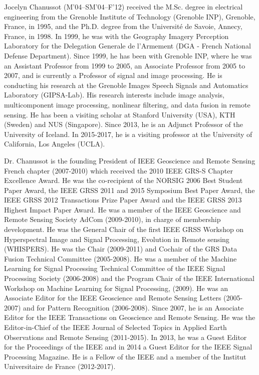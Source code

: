 \documentclass[10pt,twocolumn,twoside]{IEEEtran}
\begin{document}
\begin{IEEEbiography}{Jocelyn Chanussot} 
	(M’04–SM’04–F’12) received the M.Sc. degree in electrical engineering from the Grenoble Institute of Technology (Grenoble INP), Grenoble, France, in 1995, and the Ph.D. degree from the Université de Savoie, Annecy, France, in 1998. In 1999, he was with the Geography Imagery Perception Laboratory for the Delegation Generale de l'Armement (DGA - French National Defense Department). Since 1999, he has been with Grenoble INP, where he was an Assistant Professor from 1999 to 2005, an Associate Professor from 2005 to 2007, and is currently a Professor of signal and image processing. He is conducting his research at the Grenoble Images Speech Signals and Automatics Laboratory (GIPSA-Lab). His research interests include image analysis, multicomponent image processing, nonlinear filtering, and data fusion in remote sensing. He has been a visiting scholar at Stanford University (USA), KTH (Sweden) and NUS (Singapore). Since 2013, he is an Adjunct Professor of the University of Iceland. In 2015-2017, he is a visiting professor at the University of California, Los Angeles (UCLA).  
	
	Dr. Chanussot is the founding President of IEEE Geoscience and Remote Sensing French chapter (2007-2010) which received the 2010 IEEE GRS-S Chapter Excellence Award. He was the co-recipient of the NORSIG 2006 Best Student Paper Award, the IEEE GRSS 2011 and 2015 Symposium Best Paper Award, the IEEE GRSS 2012 Transactions Prize Paper Award and the IEEE GRSS 2013 Highest Impact Paper Award. He was a member of the IEEE Geoscience and Remote Sensing Society AdCom (2009-2010), in charge of membership development. He was the General Chair of the first IEEE GRSS Workshop on Hyperspectral Image and Signal Processing, Evolution in Remote sensing (WHISPERS). He was the Chair (2009-2011) and  Cochair of the GRS Data Fusion Technical Committee (2005-2008). He was a member of the Machine Learning for Signal Processing Technical Committee of the IEEE Signal Processing Society (2006-2008) and the Program Chair of the IEEE International Workshop on Machine Learning for Signal Processing, (2009). He was an Associate Editor for the IEEE Geoscience and Remote Sensing Letters (2005-2007) and for Pattern Recognition (2006-2008). Since 2007, he is an Associate Editor for the IEEE Transactions on Geoscience and Remote Sensing. He was the Editor-in-Chief of the IEEE Journal of Selected Topics in Applied Earth Observations and Remote Sensing (2011-2015). In 2013, he was a Guest Editor for the Proceedings of the IEEE and in 2014 a Guest Editor for the IEEE Signal Processing Magazine. He is a Fellow of the IEEE and a member of the Institut Universitaire de France (2012-2017).	
\end{IEEEbiography}
\end{document}
